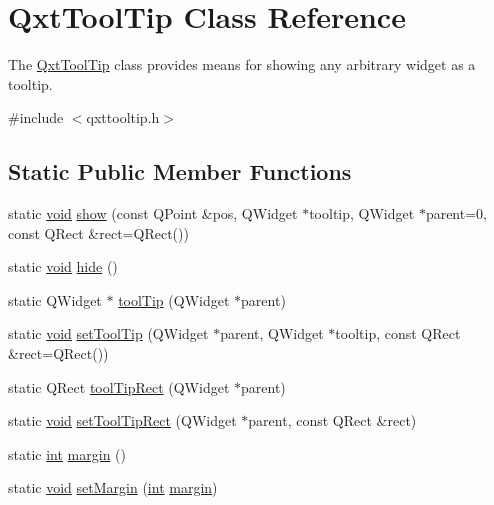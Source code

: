 \hypertarget{class_qxt_tool_tip}{\section{Qxt\-Tool\-Tip Class Reference}
\label{class_qxt_tool_tip}
}


The \hyperlink{class_qxt_tool_tip}{Qxt\-Tool\-Tip} class provides means for showing any arbitrary widget as a tooltip.  




{\ttfamily \#include $<$qxttooltip.\-h$>$}

\subsection*{Static Public Member Functions}
\begin{DoxyCompactItemize}
\item 
static \hyperlink{group___u_a_v_objects_plugin_ga444cf2ff3f0ecbe028adce838d373f5c}{void} \hyperlink{class_qxt_tool_tip_ac2b0b69670b345dcb522bea6e89917a4}{show} (const Q\-Point \&pos, Q\-Widget $\ast$tooltip, Q\-Widget $\ast$parent=0, const Q\-Rect \&rect=Q\-Rect())
\item 
static \hyperlink{group___u_a_v_objects_plugin_ga444cf2ff3f0ecbe028adce838d373f5c}{void} \hyperlink{class_qxt_tool_tip_a1a4e47ed91629ee291118e12e81f3824}{hide} ()
\item 
static Q\-Widget $\ast$ \hyperlink{class_qxt_tool_tip_acbd030657ab04e9dde5917fc7a89c32c}{tool\-Tip} (Q\-Widget $\ast$parent)
\item 
static \hyperlink{group___u_a_v_objects_plugin_ga444cf2ff3f0ecbe028adce838d373f5c}{void} \hyperlink{class_qxt_tool_tip_aa26c6f6bfc1c7c098bb03f554bd6ba66}{set\-Tool\-Tip} (Q\-Widget $\ast$parent, Q\-Widget $\ast$tooltip, const Q\-Rect \&rect=Q\-Rect())
\item 
static Q\-Rect \hyperlink{class_qxt_tool_tip_ab82fa1126c2829361b37c24e666ff477}{tool\-Tip\-Rect} (Q\-Widget $\ast$parent)
\item 
static \hyperlink{group___u_a_v_objects_plugin_ga444cf2ff3f0ecbe028adce838d373f5c}{void} \hyperlink{class_qxt_tool_tip_a0e89b465ec096c5b1a1dae26bb3c3aaf}{set\-Tool\-Tip\-Rect} (Q\-Widget $\ast$parent, const Q\-Rect \&rect)
\item 
static \hyperlink{ioapi_8h_a787fa3cf048117ba7123753c1e74fcd6}{int} \hyperlink{class_qxt_tool_tip_a02e39847e0227fa95fdb9015157f8993}{margin} ()
\item 
static \hyperlink{group___u_a_v_objects_plugin_ga444cf2ff3f0ecbe028adce838d373f5c}{void} \hyperlink{class_qxt_tool_tip_a8594a699126f87df2abb177332372032}{set\-Margin} (\hyperlink{ioapi_8h_a787fa3cf048117ba7123753c1e74fcd6}{int} \hyperlink{class_qxt_tool_tip_a02e39847e0227fa95fdb9015157f8993}{margin})

\end{DoxyCompactItemize}
